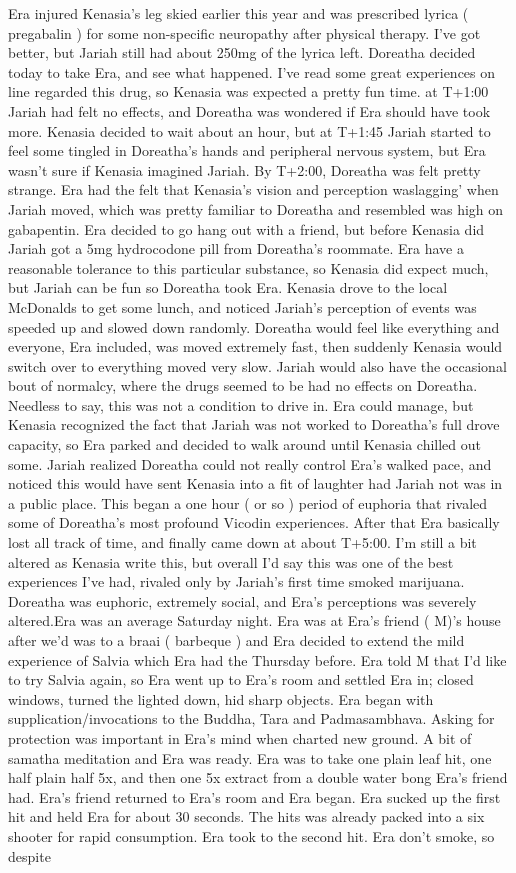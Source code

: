 \documentclass[12pt]{book}
\begin{document}
Era injured Kenasia's leg skied earlier this year and was prescribed lyrica ( pregabalin ) for some non-specific neuropathy after physical therapy. I've got better, but Jariah still had about 250mg of the lyrica left. Doreatha decided today to take Era, and see what happened. I've read some great experiences on line regarded this drug, so Kenasia was expected a pretty fun time. at T+1:00 Jariah had felt no effects, and Doreatha was wondered if Era should have took more. Kenasia decided to wait about an hour, but at T+1:45 Jariah started to feel some tingled in Doreatha's hands and peripheral nervous system, but Era wasn't sure if Kenasia imagined Jariah. By T+2:00, Doreatha was felt pretty strange. Era had the felt that Kenasia's vision and perception waslagging' when Jariah moved, which was pretty familiar to Doreatha and resembled was high on gabapentin. Era decided to go hang out with a friend, but before Kenasia did Jariah got a 5mg hydrocodone pill from Doreatha's roommate. Era have a reasonable tolerance to this particular substance, so Kenasia did expect much, but Jariah can be fun so Doreatha took Era. Kenasia drove to the local McDonalds to get some lunch, and noticed Jariah's perception of events was speeded up and slowed down randomly. Doreatha would feel like everything and everyone, Era included, was moved extremely fast, then suddenly Kenasia would switch over to everything moved very slow. Jariah would also have the occasional bout of normalcy, where the drugs seemed to be had no effects on Doreatha. Needless to say, this was not a condition to drive in. Era could manage, but Kenasia recognized the fact that Jariah was not worked to Doreatha's full drove capacity, so Era parked and decided to walk around until Kenasia chilled out some. Jariah realized Doreatha could not really control Era's walked pace, and noticed this would have sent Kenasia into a fit of laughter had Jariah not was in a public place. This began a one hour ( or so ) period of euphoria that rivaled some of Doreatha's most profound Vicodin experiences. After that Era basically lost all track of time, and finally came down at about T+5:00. I'm still a bit altered as Kenasia write this, but overall I'd say this was one of the best experiences I've had, rivaled only by Jariah's first time smoked marijuana. Doreatha was euphoric, extremely social, and Era's perceptions was severely altered.Era was an average Saturday night. Era was at Era's friend ( M)'s house after we'd was to a braai ( barbeque ) and Era decided to extend the mild experience of Salvia which Era had the Thursday before. Era told M that I'd like to try Salvia again, so Era went up to Era's room and settled Era in; closed windows, turned the lighted down, hid sharp objects. Era began with supplication/invocations to the Buddha, Tara and Padmasambhava. Asking for protection was important in Era's mind when charted new ground. A bit of samatha meditation and Era was ready. Era was to take one plain leaf hit, one half plain half 5x, and then one 5x extract from a double water bong Era's friend had. Era's friend returned to Era's room and Era began. Era sucked up the first hit and held Era for about 30 seconds. The hits was already packed into a six shooter for rapid consumption. Era took to the second hit. Era don't smoke, so despite 
\end{document}
